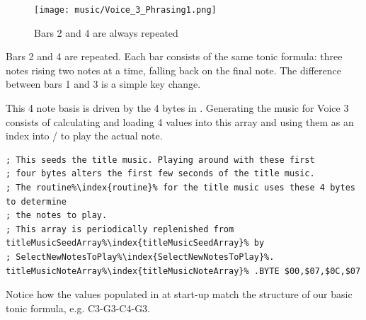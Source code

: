 \begin{figure}[H]
{
  \begin{adjustbox}{width=11cm,center}
  \texttt{[image: music/Voice\_3\_Phrasing1.png]}%
    \end{adjustbox}
}\caption[]{Bars 2 and 4 are always repeated}
\end{figure}

Bars 2 and 4 are repeated. Each bar consists of the same tonic formula: three notes rising two notes at a time,
falling back on the final note. The difference between bars 1 and 3 is a simple key change.

This 4 note basis is driven by the 4 bytes in . Generating the music for Voice 3
consists of calculating and loading 4 values into this array and using them as an index into  
/ to play the actual note.

\begin{lstlisting}[escapechar=\%]
; This seeds the title music. Playing around with these first
; four bytes alters the first few seconds of the title music.
; The routine%\index{routine}% for the title music uses these 4 bytes to determine
; the notes to play.
; This array is periodically replenished from titleMusicSeedArray%\index{titleMusicSeedArray}% by
; SelectNewNotesToPlay%\index{SelectNewNotesToPlay}%.
titleMusicNoteArray%\index{titleMusicNoteArray}% .BYTE $00,$07,$0C,$07
\end{lstlisting}

Notice how the values populated in  at start-up match the structure of our basic
tonic formula, e.g. C3-G3-C4-G3.


